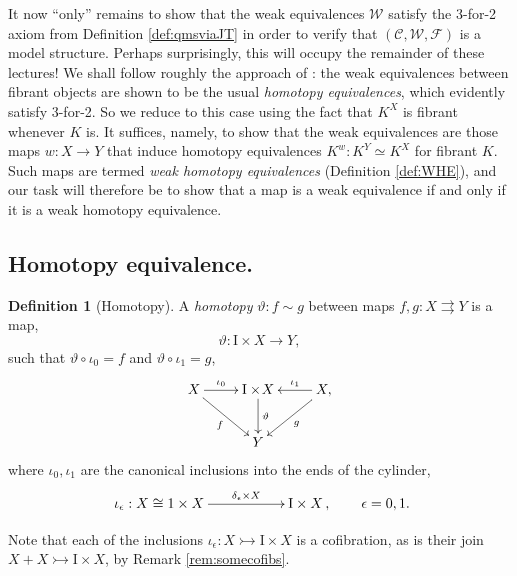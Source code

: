 \documentclass[11pt,reqno]{amsart}
\newcommand{\WW}{\ensuremath{\mathcal{W}}}
\newcommand{\cof}{\ensuremath{\rightarrowtail}}
\renewcommand{\to}{\ensuremath{\rightarrow}}
\newcommand{\too}{\ensuremath{\longrightarrow}}
\newcommand{\I}{\ensuremath{\mathrm{I}}}
\theoremstyle{remark}
\theoremstyle{definition}
\newtheorem{definition}[theorem]{Definition}
\begin{document}
It now ``only'' remains to show that the weak equivalences $\WW$ satisfy the 3-for-2 axiom from Definition \ref{def:qmsviaJT} in order to verify that $(\mathcal{C}, \mathcal{W}, \mathcal{F})$ is a model structure.  Perhaps surprisingly, this will occupy the remainder of these lectures!  We shall follow roughly the approach of \cite{JT:notes}: the weak equivalences between fibrant objects are shown to be the usual \emph{homotopy equivalences}, which evidently  satisfy 3-for-2.   So we reduce to this case using the fact that $K^X$ is fibrant whenever $K$ is.  It suffices, namely, to show that the weak equivalences are those maps $w : X\to Y$  that induce homotopy equivalences $K^w : K^Y \simeq K^X$ for fibrant $K$.   Such maps are termed \emph{weak homotopy equivalences}  (Definition \ref{def:WHE}), and our task will therefore be to show that a map is a weak equivalence if and only if it is a weak homotopy equivalence.

\subsection*{Homotopy equivalence.}

\begin{definition}[Homotopy]\label{homotopy}
A \emph{homotopy} $\vartheta : f \sim g$ between maps $f, g: X\rightrightarrows Y$  is a map,
\[
\vartheta : \I\times{X} \too Y,
\]
such that $\vartheta \circ \iota_0 = f$ and $\vartheta \circ \iota_1 = g$, 
\begin{equation}\label{diagram:defhomotopy}
\xymatrix{
X \ar[r]^-{\iota_0} \ar[rd]_f & \I\times\!{X} \ar[d]^-{\vartheta} & X, \ar[l]_-{\iota_1} \ar[ld]^g \\
& Y &
}
\end{equation}
where $\iota_0, \iota_1$  are the canonical inclusions into the ends of the cylinder,
\[
\xymatrix{
\iota_\epsilon : X \cong 1\times X \ar[rr]^-{\delta_\epsilon\times X} && \I\times X\,,} \qquad \epsilon = 0,1 .
\]
\end{definition}

Note that each of the inclusions $\iota_\epsilon : X \cof  \I\times X$ is a cofibration, as is their join $X + X \cof  \I\times X$, by Remark \ref{rem:somecofibs}.  
\end{document}
